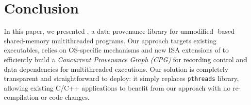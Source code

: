 \section{Conclusion}
\label{sec:conclusion}

In this paper, we presented \projecttitle, a data provenance library for unmodified \pthreads-based shared-memory multithreaded programs. Our approach targets existing executables, relies on OS-specific mechanisms and new ISA extensions of \intelpt  to efficiently build a {\em Concurrent Provenance Graph (CPG)} for recording control and data dependencies for multithreaded executions. Our solution is completely  transparent and straightforward to deploy: it simply replaces {\tt pthreads} library, allowing existing C/C++ applications to benefit from our approach with no re-compilation or code changes.  

